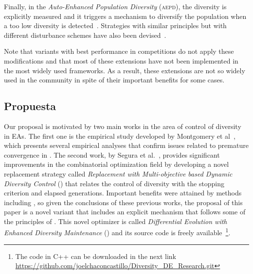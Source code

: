 Finally, in the \textit{Auto-Enhanced Population Diversity} (\textsc{aepd}), the diversity is explicitly measured and it triggers a mechanism
to diversify the population when a too low diversity is detected~\cite{yang2015differential}.
%
Strategies with similar principles but with different disturbance schemes have also been devised~\cite{zhao2016differential}.

Note that \DE{} variants with best performance in competitions do not apply these modifications
and that most of these extensions have not been implemented in the most widely used frameworks.
%
As a result, these extensions are not so widely used in the community in spite of their important benefits
for some cases.


\subsection{Propuesta}

Our proposal is motivated by two main works in the area of control of diversity in EAs.
%
The first one is the empirical study developed by Montgomery et al~\cite{montgomery2012simple},
which presents several empirical analyses that confirm issues related to premature convergence in \DE{}.
%
The second work, by Segura et al.~\cite{segura2016novel}, provides significant improvements in the combinatorial optimization field
by developing a novel replacement strategy called \textit{Replacement with Multi-objective based Dynamic Diversity Control} (\RMDDC{}) 
that relates the control of diversity with the stopping criterion and elapsed generations.
%
Important benefits were attained by methods including \RMDDC{}, so given the conclusions of these previous works, the proposal of this paper is a 
novel \DE{} variant that includes an explicit mechanism that follows some of the principles of \RMDDC{}.
%
This novel optimizer is called \textit{Differential Evolution with Enhanced Diversity Maintenance} (\DEEDM{}) and its source
code is freely available~\footnote{The code in C++ can be downloaded in the next link \url{https://github.com/joelchaconcastillo/Diversity\_DE\_Research.git}}.

